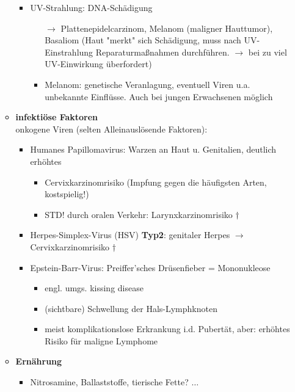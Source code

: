 \begin{itemize}
\begin{itemize}
\begin{itemize}
\begin{itemize}
								\end{itemize}
							\item UV-Strahlung: DNA-Schädigung
								\begin{itemize}
									\item[$\rightarrow$] Plattenepidelcarzinom, Melanom (maligner Hauttumor), Basaliom (Haut "merkt" sich Schädigung, muss nach UV-Einstrahlung Reparaturmaßnahmen durchführen. $\rightarrow$ bei zu viel UV-Einwirkung überfordert)
									\item Melanom: genetische Veranlagung, eventuell Viren u.a. unbekannte Einflüsse. Auch bei jungen Erwachsenen möglich
								\end{itemize}		  
						\end{itemize}	
					\item \textbf{infektiöse Faktoren}\\
						 onkogene Viren (selten Alleinauslösende Faktoren):
						\begin{itemize}
							\item Humanes Papillomavirus: Warzen an Haut u. Genitalien, deutlich erhöhtes 
								\begin{itemize}
									\item Cervixkarzinomrisiko (Impfung gegen die häufigsten Arten, kostspielig!)
									\item STD! durch oralen Verkehr: Larynxkarzinomrisiko $\dagger$
								\end{itemize}
							\item Herpes-Simplex-Virus (HSV) \textbf{Typ2}: genitaler Herpes $\rightarrow$ Cervixkarzinomrisiko $\dagger$
							\item Epstein-Barr-Virus: Preiffer'sches Drüsenfieber = Mononukleose
								\begin{itemize}
									\item engl. umgs. kissing disease
									\item (sichtbare) Schwellung der Hals-Lymphknoten
									\item meist komplikationslose Erkrankung i.d. Pubertät, aber: erhöhtes Risiko für maligne Lymphome
								\end{itemize}
						\end{itemize}
					\item \textbf{Ernährung}
						\begin{itemize}
							\item Nitrosamine, Ballaststoffe, tierische Fette? $\dots$
						\end{itemize}
				\end{itemize}
		\end{itemize}
